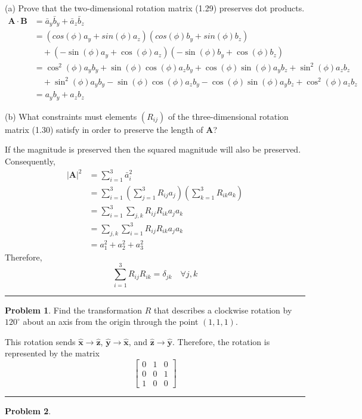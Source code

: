\documentclass{article}
\theoremstyle{definition}
\newtheorem{problem}{Problem}[section]
\theoremstyle{remark}
\newcommand{\pline}{\par\noindent\rule{\textwidth}{0.5pt}}
\newcommand{\abs}[1]{\left|#1\right|}
\renewcommand{\vec}{\mathbf}
\newcommand{\veca}{\vec{A}}
\newcommand{\vecb}{\vec{B}}
\newcommand{\xhat}{\hat{\vec{x}}}
\newcommand{\yhat}{\hat{\vec{y}}}
\newcommand{\zhat}{\hat{\vec{z}}}
\begin{document}
\begin{description}
	\item{(a)} Prove that the two-dimensional rotation matrix (1.29) preserves dot products.
\begin{align*}
\veca \cdot \vecb &= \bar{a}_y\bar{b}_y + \bar{a}_z\bar{b}_z \\
&= (cos(\phi)a_y+sin(\phi)a_z)(cos(\phi)b_y+sin(\phi)b_z) \\
&\quad +(-\sin(\phi)a_y+\cos(\phi)a_z)(-\sin(\phi)b_y+\cos(\phi)b_z) \\
&=\cos^2(\phi)a_yb_y+ \sin(\phi)\cos(\phi)a_zb_y+ \cos(\phi)\sin(\phi)a_yb_z+ \sin^2(\phi)a_zb_z \\
&\quad +\sin^2(\phi)a_yb_y- \sin(\phi)\cos(\phi)a_zb_y- \cos(\phi)\sin(\phi)a_yb_z+ \cos^2(\phi)a_zb_z \\
&= a_yb_y+a_zb_z
\end{align*}

	\item{(b)} What constraints must elements $(R_{ij})$ of the three-dimensional rotation matrix (1.30) satisfy in order to preserve the length of $\veca$?

If the magnitude is preserved then the squared magnitude will also be preserved. Consequently,
\begin{align*}
\abs{\veca}^2 &= \sum_{i=1}^3\bar{a}_i^2 \\
&= \sum_{i=1}^3\left(\sum_{j=1}^3R_{ij}a_j\right)\left(\sum_{k=1}^3R_{ik}a_k\right) \\
&= \sum_{i=1}^3\sum_{j,k} R_{ij}R_{ik}a_ja_k \\
&= \sum_{j,k}\sum_{i=1}^3 R_{ij}R_{ik}a_ja_k \\
&= a_1^2+a_2^2+a_3^2
\end{align*}
Therefore, \[\sum_{i=1}^3R_{ij}R_{ik} = \delta_{jk} \quad \forall j,k\]
\end{description}
\pline
\begin{problem}
Find the transformation $R$ that describes a clockwise rotation by $120^{\circ}$ about an axis from the origin through the point $(1,1,1)$. 
\end{problem}
This rotation sends $\xhat \to \zhat$, $\yhat \to \xhat$, and $\zhat \to \yhat$. Therefore, the rotation is represented by the matrix
\[\begin{bmatrix}0 & 1 & 0 \\ 0 & 0 & 1 \\ 1 & 0 & 0 \end{bmatrix}\]
\pline
\begin{problem}
\end{problem}
\end{document}
